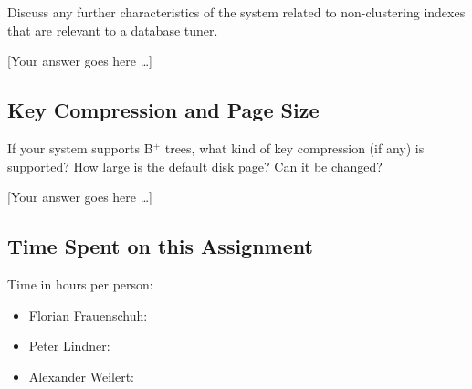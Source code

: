 \documentclass[11pt]{scrartcl}
\newcommand{\youranswerhere}{[Your answer goes here \ldots]}
\begin{document}
Discuss any further characteristics of the system related to non-clustering indexes that are relevant to a database tuner.

\youranswerhere{}

\subsection{Key Compression and Page Size}

If your system supports B$^+$ trees, what kind of key compression (if any) is supported? How large is the default disk page? Can it be changed?

\youranswerhere{}

\subsection*{Time Spent on this Assignment}

Time in hours per person:
\begin{itemize}
  \item Florian Frauenschuh: \textbf{}
  \item Peter Lindner: \textbf{}
  \item Alexander Weilert: \textbf{}
\end{itemize}

\pagebreak

\printbibliography[title=References]
\end{document}

